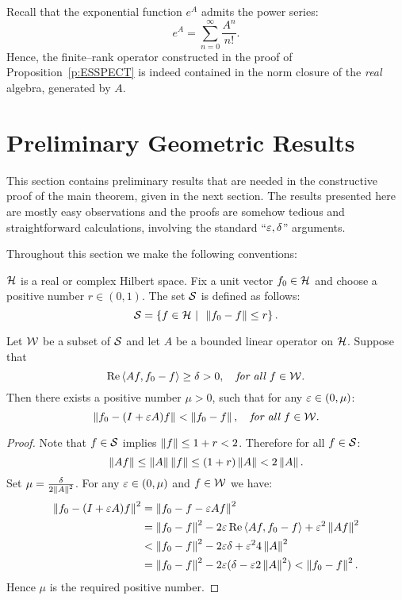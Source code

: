 \begin{rem}
Recall that the exponential function $e^A$ admits the power
series:
\[ e^A = \sum_{n=0}^{\infty} \frac{A^n}{n!}. \]
Hence, the finite--rank operator constructed in the proof of
Proposition~\ref{p:ESSPECT} is indeed contained in the norm
closure of the {\em real} algebra, generated by $A$.
\end{rem}

\goodbreak
\section{Preliminary Geometric Results}

{
\def\baselinestretch{1.6}

This section contains preliminary results that are needed in
the constructive proof of the main theorem, given in the next
section. The results presented here are mostly easy
observations and the proofs are somehow tedious and
straightforward calculations, involving the standard
``$\varepsilon,\delta$'' arguments.

\smallskip

Throughout this section we make the following conventions:

${\cal H}$ is a real or complex Hilbert space. Fix a unit vector
$f_0\in{\cal H}$ and choose a positive number $r\in(0,1)$. The set
${\cal S}$ is defined as follows:
\[ {\cal S} = \left\{f\in{\cal H}\,\,|\,\,\, \left\Vert f_0-f\right\Vert\leq r\right\}. \]

\begin{lem} \label{l:APPROX}
Let ${\cal W}$ be a subset of ${\cal S}$ and let $A$ be a bounded linear
operator on ${\cal H}$. Suppose that
\[ \operatorname{Re}\left<A{}f,f_0-f\right>\geq\delta>0, \quad \text{\em for all $f\in{\cal W}$.} \]
Then there exists a positive number $\mu>0$, such that for any
$\varepsilon\in(0,\mu)$:
\[ \left\Vert f_0 - (I+\varepsilon A)f\right\Vert < \left\Vert f_0 - f\right\Vert,
   \quad \text{\em for all $f\in{\cal W}$.} \]
\end{lem}

\begin{proof}
Note that $f\in{\cal S}$ implies $\left\Vert f\right\Vert \leq 1 + r < 2$. Therefore
for all $f\in{\cal S}$:
\[ \left\Vert A{}f\right\Vert \leq \left\Vert A\right\Vert\left\Vert f\right\Vert \leq (1+r) \left\Vert A\right\Vert < 2\left\Vert A\right\Vert. \]
Set $\mu=\tfrac{\delta}{2\left\Vert A\right\Vert^2}$. For any $\varepsilon\in(0,\mu)$
and $f\in{\cal W}$ we have:
\begin{equation*}
\begin{split}
\left\Vert f_0 - (I+\varepsilon A)f\right\Vert^2 &= \left\Vert f_0-f - \varepsilon A f\right\Vert^2 \\
 & = \left\Vert f_0-f\right\Vert^2 - 2\varepsilon\operatorname{Re}\left<A{}f,f_0-f\right> + \varepsilon^2\left\Vert A{}f\right\Vert^2 \\
 & < \left\Vert f_0-f\right\Vert^2 - 2\varepsilon\delta + \varepsilon^2 4\left\Vert A\right\Vert^2 \\
 & = \left\Vert f_0-f\right\Vert^2 - 2\varepsilon(\delta - \varepsilon 2\left\Vert A\right\Vert^2) < \left\Vert f_0-f\right\Vert^2.
\end{split}
\end{equation*}
Hence $\mu$ is the required positive number.
\end{proof}

\def\baselinestretch{1.66}
}

